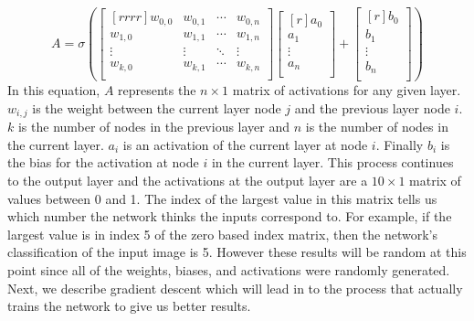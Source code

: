 \documentclass[12pt]{article}
\theoremstyle{definition}
\theoremstyle{plain}
\begin{document}
\begin{equation}\label{eqn:Activation}
A = \sigma \left( \begin{bmatrix}[rrrr]
	w_{0,0} & w_{0,1} & \cdots & w_{0,n}\\
	w_{1,0} & w_{1,1} & \cdots & w_{1,n}\\
	\vdots & \vdots & \ddots & \vdots\\
	w_{k,0} & w_{k,1} & \cdots & w_{k,n}\\\end{bmatrix}
	\begin{bmatrix}[r]
	a_0\\
	a_1\\
	\vdots\\
	a_n\\\end{bmatrix} +
	\begin{bmatrix}[r]
	b_0\\
	b_1\\
	\vdots\\
	b_n\\\end{bmatrix} \right)
\end{equation}
In this equation, $A$ represents the $n\times 1$ matrix of activations for any given layer. $w_{i,j}$ is the weight between the current layer node $j$ and the previous layer node $i$. $k$ is the number of nodes in the previous layer and $n$ is the number of nodes in the current layer. $a_i$ is an activation of the current layer at node $i$. Finally $b_i$ is the bias for the activation at node $i$ in the current layer. This process continues to the output layer and the activations at the output layer are a $10\times 1$ matrix of values between 0 and 1. The index of the largest value in this matrix tells us which number the network thinks the inputs correspond to. For example, if the largest value is in index 5 of the zero based index matrix, then the network's classification of the input image is 5. However these results will be random at this point since all of the weights, biases, and activations were randomly generated. Next, we describe gradient descent which will lead in to the process that actually trains the network to give us better results.
\end{document}
